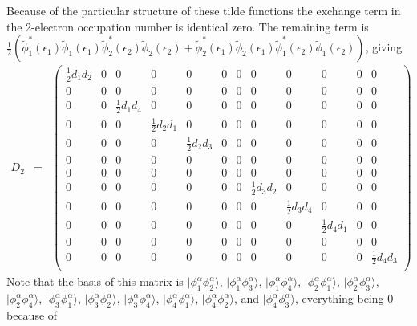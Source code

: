 \documentclass{amsart}
\begin{document}
\begin{itemize}
         Because of the particular structure of these tilde functions the exchange term in the
         2-electron occupation number is identical zero. The remaining term is 
         $\frac{1}{2}\left(\tilde{\phi}_1^*(\epsilon_1)\tilde{\phi}_1(\epsilon_1)\tilde{\phi}_2^*(\epsilon_2)\tilde{\phi}_2(\epsilon_2)+\tilde{\phi}_2^*(\epsilon_1)\tilde{\phi}_2(\epsilon_1)\tilde{\phi}_1^*(\epsilon_2)\tilde{\phi}_1(\epsilon_2)\right)$, giving
         \begin{eqnarray}
         \label{Eq:D2aa-1-electron}
         D_2 &=&
         \begin{pmatrix}
         \frac{1}{2}d_1 d_2 & 0 & 0 & 0 & 0 & 0 & 0 & 0 & 0 & 0 & 0 & 0 \\
         0 & 0 & 0 & 0 & 0 & 0 & 0 & 0 & 0 & 0 & 0 & 0 \\
         0 & 0 & \frac{1}{2}d_1 d_4 & 0 & 0 & 0 & 0 & 0 & 0 & 0 & 0 & 0 \\
         0 & 0 & 0 & \frac{1}{2}d_2 d_1 & 0 & 0 & 0 & 0 & 0 & 0 & 0 & 0 \\
         0 & 0 & 0 & 0 & \frac{1}{2}d_2 d_3 & 0 & 0 & 0 & 0 & 0 & 0 & 0 \\
         0 & 0 & 0 & 0 & 0 & 0 & 0 & 0 & 0 & 0 & 0 & 0 \\
         0 & 0 & 0 & 0 & 0 & 0 & 0 & 0 & 0 & 0 & 0 & 0 \\
         0 & 0 & 0 & 0 & 0 & 0 & 0 & \frac{1}{2}d_3 d_2 & 0 & 0 & 0 & 0 \\
         0 & 0 & 0 & 0 & 0 & 0 & 0 & 0 & \frac{1}{2}d_3 d_4 & 0 & 0 & 0  \\
         0 & 0 & 0 & 0 & 0 & 0 & 0 & 0 & 0 & \frac{1}{2}d_4 d_1 & 0 & 0  \\
         0 & 0 & 0 & 0 & 0 & 0 & 0 & 0 & 0 & 0 & 0 & 0  \\
         0 & 0 & 0 & 0 & 0 & 0 & 0 & 0 & 0 & 0 & 0 & \frac{1}{2}d_4 d_3  \\
         \end{pmatrix}
         \end{eqnarray}
         Note that the basis of this matrix is $|\phi^\alpha_1\phi^\alpha_2\rangle$,
         $|\phi^\alpha_1\phi^\alpha_3\rangle$, $|\phi^\alpha_1\phi^\alpha_4\rangle$,
         $|\phi^\alpha_2\phi^\alpha_1\rangle$, $|\phi^\alpha_2\phi^\alpha_3\rangle$,
         $|\phi^\alpha_2\phi^\alpha_4\rangle$, $|\phi^\alpha_3\phi^\alpha_1\rangle$,
         $|\phi^\alpha_3\phi^\alpha_2\rangle$, $|\phi^\alpha_3\phi^\alpha_4\rangle$,
         $|\phi^\alpha_4\phi^\alpha_1\rangle$, $|\phi^\alpha_4\phi^\alpha_2\rangle$,
         and $|\phi^\alpha_4\phi^\alpha_3\rangle$, everything being $0$ because of

\end{itemize}
\end{document}
